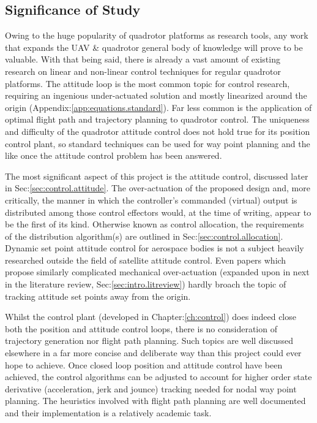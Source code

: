 \subsection{Significance of Study}
\label{subsec:intro.foreword.significance}
Owing to the huge popularity of quadrotor platforms as research tools, any work that expands the UAV \& quadrotor general body of knowledge will prove to be valuable. With that being said, there is already a vast amount of existing research on linear and non-linear control techniques for regular quadrotor platforms. The attitude loop is the most common topic for control research, requiring an ingenious under-actuated solution and mostly linearized around the origin (Appendix:\ref{app:equations.standard}). Far less common is the application of optimal flight path and trajectory planning to quadrotor control. The uniqueness and difficulty of the quadrotor attitude control does not hold true for its position control plant, so standard techniques can be used for way point planning and the like once the attitude control problem has been answered.
\par
The most significant aspect of this project is the attitude control, discussed later in Sec:\ref{sec:control.attitude}. The over-actuation of the proposed design and, more critically, the manner in which the controller's commanded (virtual) output is distributed among those control effectors would, at the time of writing, appear to be the first of its kind. Otherwise known as control allocation, the requirements of the distribution algorithm(s) are outlined in Sec:\ref{sec:control.allocation}. Dynamic set point attitude control for aerospace bodies is not a subject heavily researched outside the field of satellite attitude control. Even papers which propose similarly complicated mechanical over-actuation (expanded upon in next in the literature review, Sec:\ref{sec:intro.litreview}) hardly broach the topic of tracking attitude set points away from the origin.
\par
Whilst the control plant (developed in Chapter:\ref{ch:control}) does indeed close both the position and attitude control loops, there is no consideration of trajectory generation nor flight path planning. Such topics are well discussed elsewhere in a far more concise and deliberate way than this project could ever hope to achieve. Once closed loop position and attitude control have been achieved, the control algorithms can be adjusted to account for higher order state derivative (acceleration, jerk and jounce) tracking needed for nodal way point planning. The heuristics involved with flight path planning are well documented and their implementation is a relatively academic task.
